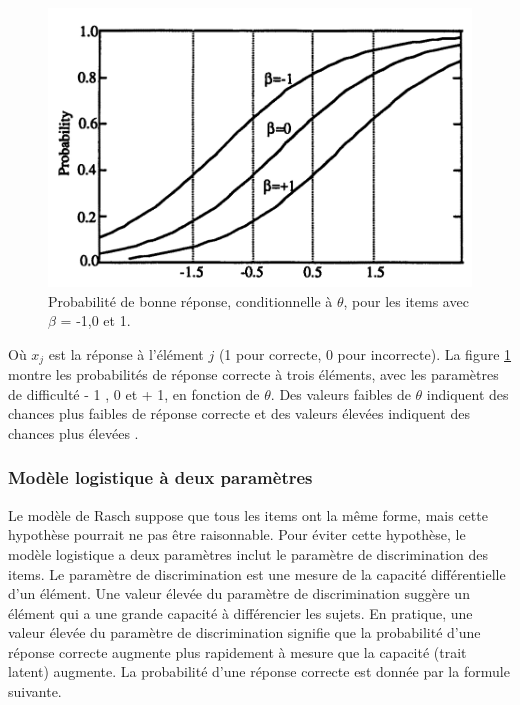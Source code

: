 \begin{figure}[H]
	\begin{center}
		\includegraphics[scale=0.6]{images/chapitre5/parameters_probability.png}
	\end{center}
	\caption{Probabilité de bonne réponse, conditionnelle à \(\displaystyle \theta \), pour les items avec \(\displaystyle \beta \) = -1,0 et 1.}
	\label{parameters_probability}
\end{figure}
Où \(\displaystyle x_{j} \)  est la réponse à l'élément \(\displaystyle j \) (1 pour correcte, 0 pour incorrecte). La figure \ref{parameters_probability} montre les probabilités de réponse correcte à trois éléments, avec les paramètres de difficulté - 1 , 0 et + 1, en fonction de \(\displaystyle \theta \). Des valeurs faibles de \(\displaystyle \theta \) indiquent des chances plus faibles de réponse correcte et des valeurs élevées indiquent des chances plus élevées \cite{mislevy1994evidence}.

\subsubsection{Modèle logistique à deux paramètres}
Le modèle de Rasch suppose que tous les items ont la même forme, mais cette hypothèse pourrait ne pas être raisonnable. Pour éviter cette hypothèse, le modèle logistique a deux paramètres inclut le paramètre de discrimination des items. Le paramètre de discrimination est une mesure de la capacité différentielle d'un élément. Une valeur élevée du paramètre de discrimination suggère un élément qui a une grande capacité à différencier les sujets. En pratique, une valeur élevée du paramètre de discrimination signifie que la probabilité d'une réponse correcte augmente plus rapidement à mesure que la capacité (trait latent) augmente. La probabilité d'une réponse correcte est donnée par la formule suivante. \\

